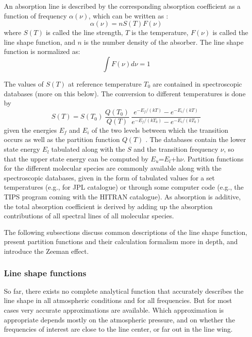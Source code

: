 An absorption line is described by the corresponding 
absorption coefficient as a function of frequency $\alpha(\nu)$, which
can be written as \citep{goodyandyung:89}:
\begin{equation}\label{eq:abs_coeff}
  \alpha(\nu)=nS(T)F(\nu)
\end{equation} 
where $S(T)$ is called the line strength, $T$ is the temperature,
$F(\nu)$ is called the line shape function, and
$n$ is the number density of the absorber. The line shape
function is normalized as:
\begin{equation}\label{eq:abs_theory:line_shape_norm}
  \int F(\nu)d\nu=1
\end{equation}

The values of $S(T)$ at reference temperature $T_0$ are contained in
spectroscopic databases (more on this below). The conversion to
different temperatures is done by
\begin{equation}\label{eq:abs_theory:line_intensity}
  S(T)=S(T_0)~\frac{Q(T_0)}{Q(T)}~\frac{e^{-E_f/(kT)}
    - e^{-E_i/(kT)}}{e^{-E_f/(kT_0)} - e^{-E_i/(kT_0)}}
\end{equation}
given the energies $E_f$ and $E_i$ of the two levels between which the
transition occurs as well as the partition function  $Q(T)$ \citep{rothman:98}.
The databases contain the lower state energy $E_l$ tabulated along with
the $S$ and the transition frequency $\nu$, so that the upper state
energy can be computed by $E_u$=$E_l$+h$\nu$. Partition functions for
the different molecular species are commonly available along with the
spectroscopic databases, given in the form of tabulated values for a set
temperatures (e.g., for JPL catalogue) or through some computer code (e.g.,
the TIPS program coming with the HITRAN catalogue). As absorption is additive,
the total absorption coefficient is derived by adding up the absorption
contributions of all spectral lines of all molecular species.

The following subsections discuss common descriptions of the line shape
function, present partition functions and their calculation formalism more in
depth, and introduce the Zeeman effect.


\subsubsection{Line shape functions} 
\label{sec:abs_theory:shape}

So far, there exists no complete analytical function that accurately
describes the line shape in all atmospheric conditions and for all
frequencies. But for most cases very accurate approximations are
available. Which approximation is appropriate depends mostly on the
atmospheric pressure, and on whether the frequencies of interest are
close to the line center, or far out in the line wing.


